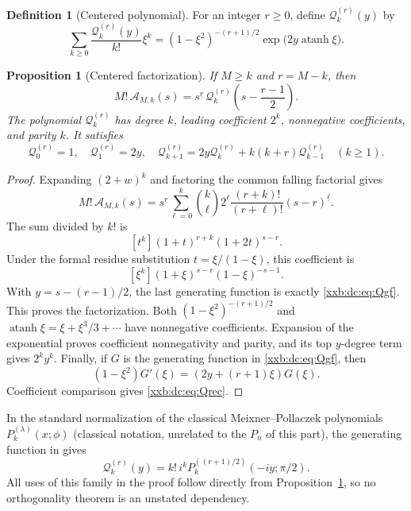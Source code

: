 \documentclass[11pt,a4paper]{article}
\numberwithin{equation}{section}
\newtheorem{proposition}[theorem]{Proposition}
\theoremstyle{definition}
\newtheorem{definition}[theorem]{Definition}
\theoremstyle{remark}
\theoremstyle{plain}
\DeclareMathOperator{\atanh}{atanh}
\newcommand{\fall}[2]{#1^{\underline{#2}}}
\begin{document}
\begin{definition}[Centered polynomial]\label{xxb:dc:def:Q}
For an integer $r\ge0$, define $\mathcal Q_k^{(r)}(y)$ by
\begin{equation}\label{xxb:dc:eq:Qgf}
 \sum_{k\ge0}\frac{\mathcal Q_k^{(r)}(y)}{k!}\xi^k
 =(1-\xi^2)^{-(r+1)/2}\exp\bigl(2y\atanh \xi\bigr).
\end{equation}
\end{definition}

\begin{proposition}[Centered factorization]\label{xxb:dc:prop:factor}
If $M\ge k$ and $r=M-k$, then
\begin{equation}\label{xxb:dc:eq:factor}
 M!\,\mathcal A_{M,k}(s)=\fall{s}{r}\,
 \mathcal Q_k^{(r)}\!\left(s-\frac{r-1}{2}\right).
\end{equation}
The polynomial $\mathcal Q_k^{(r)}$ has degree $k$, leading coefficient $2^k$,
nonnegative coefficients, and parity $k$.  It satisfies
\begin{equation}\label{xxb:dc:eq:Qrec}
 \mathcal Q_0^{(r)}=1,\quad \mathcal Q_1^{(r)}=2y,\quad
 \mathcal Q_{k+1}^{(r)}=2y\mathcal Q_k^{(r)}+k(k+r)\mathcal Q_{k-1}^{(r)}\quad(k\ge1).
\end{equation}
\end{proposition}
\begin{proof}
Expanding $(2+w)^k$ and factoring the common falling factorial gives
\[
 M!\,\mathcal A_{M,k}(s)
 =\fall{s}{r}\sum_{\ell=0}^k\binom k\ell2^\ell
       \frac{(r+k)!}{(r+\ell)!}\fall{(s-r)}{\ell}.
\]
The sum divided by $k!$ is
\[
 [t^k](1+t)^{r+k}(1+2t)^{s-r}.
\]
Under the formal residue substitution $t=\xi/(1-\xi)$, this coefficient is
\[
 [\xi^k](1+\xi)^{s-r}(1-\xi)^{-s-1}.
\]
With $y=s-(r-1)/2$, the last generating function is exactly
\eqref{xxb:dc:eq:Qgf}.  This proves the factorization.
Both $(1-\xi^2)^{-(r+1)/2}$ and $\atanh \xi=\xi+\xi^3/3+\cdots$ have nonnegative
coefficients.  Expansion of the exponential proves coefficient
nonnegativity and parity, and its top $y$-degree term gives $2^ky^k$.
Finally, if $G$ is the generating function in \eqref{xxb:dc:eq:Qgf}, then
\[
 (1-\xi^2)G'(\xi)=(2y+(r+1)\xi)G(\xi).
\]
Coefficient comparison gives \eqref{xxb:dc:eq:Qrec}.
\end{proof}

In the standard normalization of the classical Meixner--Pollaczek
polynomials $P_k^{(\lambda)}(x;\phi)$ (classical notation, unrelated to the
$P_n$ of this part), the generating function in \cite[Eq.~18.23.7]{xxbdc-dlmf}
gives
\begin{equation}\label{xxb:dc:eq:MP}
 \mathcal Q_k^{(r)}(y)=k!\,i^kP_k^{((r+1)/2)}(-iy;\pi/2).
\end{equation}
All uses of this family in the proof follow directly from
Proposition~\ref{xxb:dc:prop:factor}, so no orthogonality theorem is an
unstated dependency.
\end{document}
